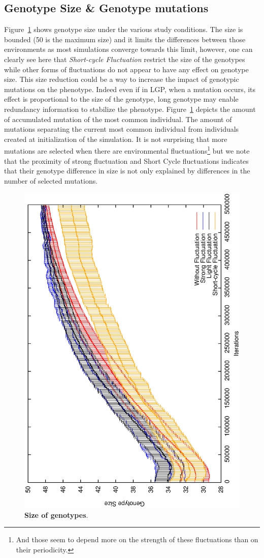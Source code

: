 \subsection{Genotype Size \& Genotype mutations}

Figure~\ref{fig:Size} shows genotype size under the various study conditions. The size is bounded (50 is the maximum size) and it limits the differences between those environments as most simulations converge towards this limit, however, one can clearly see here that \emph{Short-cycle Fluctuation} restrict the size of the genotypes while other forms of fluctuations do not appear to have any effect on genotype size. This size reduction could be a way to increase the impact of genotypic mutations on the phenotype. Indeed even if in LGP, when a mutation occurs, its effect is proportional to the size of the genotype, long genotype may enable redundancy information to stabilize the phenotype. Figure~\ref{fig:Size} depicts the amount of accumulated mutation of the most common individual. The amount of mutations separating the current most common individual from individuals created at initialization of the simulation. It is not surprising that more mutations are selected when there are environmental fluctuations\footnote{And those seem to depend more on the strength of these fluctuations than on their periodicity.} but we note that the proximity of strong fluctuation and Short Cycle fluctuations indicates that their genotype difference in size is not only explained by differences in the number of selected mutations.


\begin{figure}[h]
\centering
\includegraphics[width=0.7\columnwidth, angle =-90 ]{img/Size}
\caption{\textbf{Size of genotypes}. 
}
\label{fig:Size}
\end{figure}

